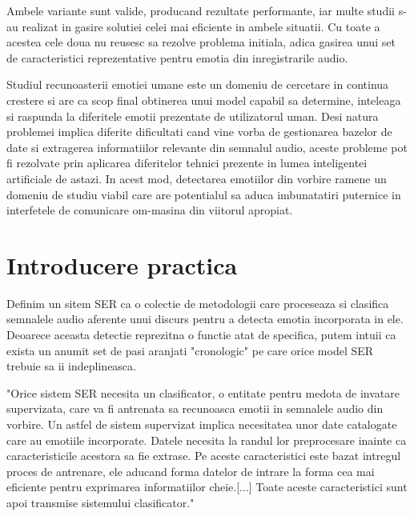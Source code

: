 \documentclass[a4paper,12pt, twoside]{book}
\begin{document}
					Ambele variante sunt valide, producand rezultate performante, iar multe studii s-au realizat in gasire solutiei celei mai eficiente in ambele situatii. Cu toate a acestea cele doua nu reusesc sa rezolve problema initiala, adica gasirea unui set de caracteristici reprezentative pentru emotia din inregistrarile audio. \par
					\hfill \par
					\hfill \par
					\hfill \par
					\hfill \par
					\hfill \par
					Studiul recunoasterii emotiei umane este un domeniu de cercetare in continua crestere si are ca scop final obtinerea unui model capabil sa determine, inteleaga si raspunda la diferitele emotii prezentate de utilizatorul uman. Desi natura problemei implica diferite dificultati cand vine vorba de gestionarea bazelor de date si extragerea informatiilor relevante din semnalul audio, aceste probleme pot fi rezolvate prin aplicarea diferitelor tehnici prezente in lumea inteligentei artificiale de astazi. In acest mod, detectarea emotiilor din vorbire ramene un domeniu de studiu viabil care are potentialul sa aduca imbunatatiri puternice in interfetele de comunicare om-masina din viitorul apropiat. \par
											
	\chapter{Introducere practica}
				Definim un sitem SER ca o colectie de metodologii care proceseaza si clasifica semnalele audio aferente unui discurs pentru a detecta emotia incorporata in ele. Deoarece aceasta detectie reprezitna o functie atat de specifica, putem intuii ca exista un anumit set de pasi aranjati "cronologic" pe care orice model SER trebuie sa ii indeplineasca. \par
				
				"Orice sistem SER necesita un clasificator, o entitate pentru medota de invatare supervizata, care va fi antrenata sa recunoasca emotii in semnalele audio din vorbire. Un astfel de sistem supervizat implica necesitatea unor date catalogate care au emotiile incorporate. Datele necesita la randul lor preprocesare inainte ca caracteristicile acestora sa fie extrase. Pe aceste caracteristici este bazat intregul proces de antrenare, ele aducand forma datelor de intrare la forma cea mai eficiente pentru exprimarea informatiilor cheie.[...] Toate aceste caracteristici sunt apoi transmise sistemului clasificator." \cite{mehmet} 
				
\end{document}
